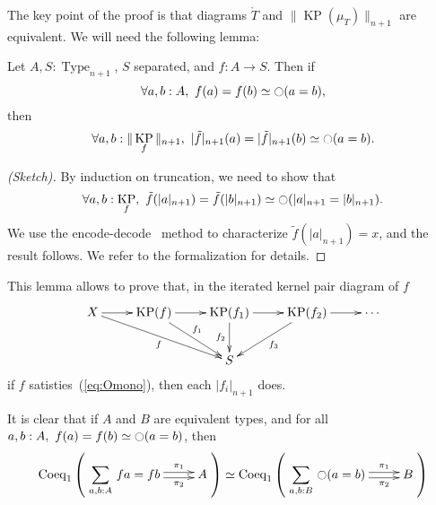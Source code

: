 \documentclass[notfinal]{jfrarticle}
\DeclareMathOperator{\Type}{Type}
\newcommand{\modal}{\ensuremath{\ocircle}}
\newcommand{\sumD}[3]{\sum_{#1:#2}\, #3}
\newcommand{\code}[1]{\texttt{#1}}
\DeclareMathOperator{\KP}{KP}
\begin{document}
The key point of the proof is that diagrams $\mathring T$ and $\|\KP(\mu_T)\|_{n+1}$
are equivalent.
We will need the following lemma:

\begin{lem}[\thethm\ (\code{OT\_Omono\_sep})]
\label{lem:Omono}
  Let $A,S:\Type_{n+1}$, $S$ separated, and $f:A \to S$. Then if 
  \begin{equation}
    \label{eq:Omono}
    \forall a,b:A,~f (a) = f (b) \simeq \modal (a=b),
  \end{equation}
  then
  \[\forall a,b:\|\KP_f\|_{n+1},~|\tilde f|_{n+1} (a) = |\tilde f|_{n+1} (b) \simeq \modal (a=b).\]
\end{lem}

\begin{proof}[(Sketch)]
  By induction on truncation, we need to show that 
  \[\forall a,b:\KP_f,~\tilde f (|a|_{n+1}) = \tilde f (|b|_{n+1} )\simeq
  \modal (|a|_{n+1}=|b|_{n+1}).\]%
  We use the encode-decode~\cite[Section 8.9]{hottbook} method to characterize $\tilde f (|a|_{n+1})
  = x$, and the result follows. We refer to the formalization for details.
\end{proof}

This lemma allows to prove that, in the iterated kernel pair diagram
of $f$
\[
  \xymatrix{
    X \ar[r] \ar[rrd]_f & \KP(f) \ar[r] \ar[rd]^{f_1} & \KP(f_1)
    \ar[r] \ar[d]_{f_2} & \KP(f_2) \ar[r] \ar[ld]^{f_3}& \cdots \\
    && S &&
  }
\]
if $f$ satisties~(\ref{eq:Omono}), then each $|f_i|_{n+1}$ does.

\begin{rmq}
It is clear that if $A$ and $B$ are equivalent types, and for all $a,b:A,~f (a) = f (b) \simeq \modal
(a=b)$, then 
\[
    \mathrm{Coeq}_1 \left( 
      \xymatrix{
        \displaystyle{\sumD {a,b} A {f a = f b}} \ar@<-.5ex>[r]_-{\pi_2} \ar@<.5ex>[r]^-{\pi_1} & A
      }
    \right)
    \simeq \mathrm{Coeq}_1 \left( 
      \xymatrix{\displaystyle{\sumD {a,b} B {\modal (a=b)}} \ar@<-.5ex>[r]_-{\pi_2} \ar@<.5ex>[r]^-{\pi_1} & B}
    \right)
  \]
\end{rmq}
\end{document}

